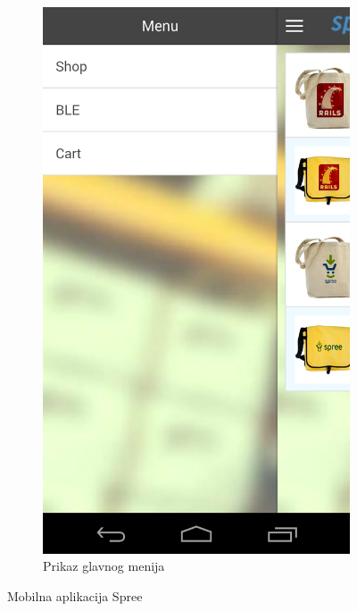 \begin{figure}[H]
\begin{subfigure}[b]{0.45\textwidth}
        \includegraphics[scale=0.15]{pictures/spreeMobile2}
        \caption{Prikaz glavnog menija}
        \label{fig:spreeMobile2}
    \end{subfigure}
    
    \caption{Mobilna aplikacija Spree}
\end{figure}